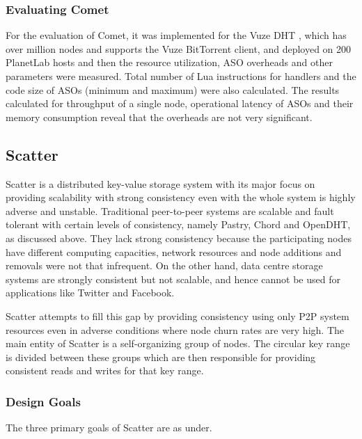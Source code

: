 \documentclass[11pt,a4paper]{article}
\begin{document}
    \subsubsection{Evaluating Comet}
    
    For the evaluation of Comet, it was implemented for the Vuze DHT \cite{vuze}, which has over million nodes and supports the Vuze BitTorrent client, and deployed on 200 PlanetLab \cite{PlanetLab, PlanetLabPeterson} hosts and then the resource utilization, ASO overheads and other parameters were measured. Total number of Lua instructions for handlers and the code size of ASOs (minimum and maximum) were also calculated. The results calculated for throughput of a single node, operational latency of ASOs and their memory consumption reveal that the overheads are not very significant.
    
    \subsection{Scatter} \label{scatter}
    
    Scatter \cite{ScatterGlendenning} is a distributed key-value storage system with its major focus on providing scalability with strong consistency even with the whole system is highly adverse and unstable. Traditional peer-to-peer systems are scalable and fault tolerant with certain levels of consistency, namely Pastry, Chord and OpenDHT, as discussed above. They lack strong consistency because the participating nodes have different computing capacities, network resources and node additions and removals were not that infrequent. On the other hand, data centre storage systems are strongly consistent but not scalable, and hence cannot be used for applications like Twitter and Facebook.
    
    Scatter attempts to fill this gap by providing consistency using only P2P system resources even in adverse conditions where node churn rates are very high. The main entity of Scatter is a self-organizing group of nodes. The circular key range is divided between these groups which are then responsible for providing consistent reads and writes for that key range.
    
    \subsubsection{Design Goals}
    
    The three primary goals of Scatter are as under.
    
\end{document}
